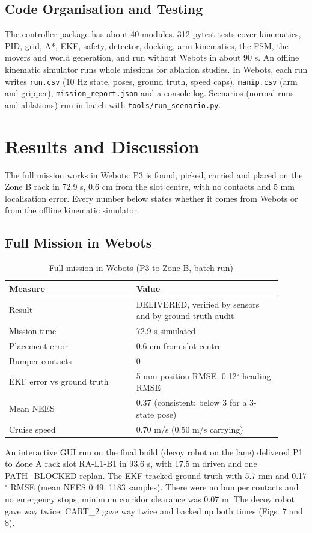 \documentclass[conference]{IEEEtran}
\begin{document}
\subsection{Code Organisation and Testing}
The controller package has about 40 modules. 312 pytest tests cover kinematics, PID, grid, A*, EKF, safety, detector, docking, arm kinematics, the FSM, the movers and world generation, and run without Webots in about 90 s. An offline kinematic simulator runs whole missions for ablation studies. In Webots, each run writes \texttt{run.csv} (10 Hz state, poses, ground truth, speed caps), \texttt{manip.csv} (arm and gripper), \texttt{mission\_\allowbreak{}report.json} and a console log. Scenarios (normal runs and ablations) run in batch with \texttt{tools/run\_\allowbreak{}scenario.py}.

\section{Results and Discussion}
The full mission works in Webots: P3 is found, picked, carried and placed on the Zone B rack in 72.9 s, 0.6 cm from the slot centre, with no contacts and 5 mm localisation error. Every number below states whether it comes from Webots or from the offline kinematic simulator.

\subsection{Full Mission in Webots}
\begin{table}[!t]
\caption{Full mission in Webots (P3 to Zone B, batch run)}
\centering
\footnotesize
\renewcommand{\arraystretch}{1.2}
\begin{tabular}{p{0.42\linewidth}p{0.48\linewidth}}
\hline
\textbf{Measure} & \textbf{Value} \\ \hline
Result & DELIVERED, verified by sensors and by ground-truth audit \\
Mission time & 72.9 s simulated \\
Placement error & 0.6 cm from slot centre \\
Bumper contacts & 0 \\
EKF error vs ground truth & 5 mm position RMSE, 0.12$^\circ$ heading RMSE \\
Mean NEES & 0.37 (consistent: below 3 for a 3-state pose) \\
Cruise speed & 0.70 m/s (0.50 m/s carrying) \\
\hline
\end{tabular}
\end{table}
An interactive GUI run on the final build (decoy robot on the lane) delivered P1 to Zone A rack slot RA-L1-B1 in 93.6 s, with 17.5 m driven and one PATH\_BLOCKED replan. The EKF tracked ground truth with 5.7 mm and 0.17$^\circ$ RMSE (mean NEES 0.49, 1183 samples). There were no bumper contacts and no emergency stops; minimum corridor clearance was 0.07 m. The decoy robot gave way twice; CART\_2 gave way twice and backed up both times (Figs. 7 and 8).
\end{document}

